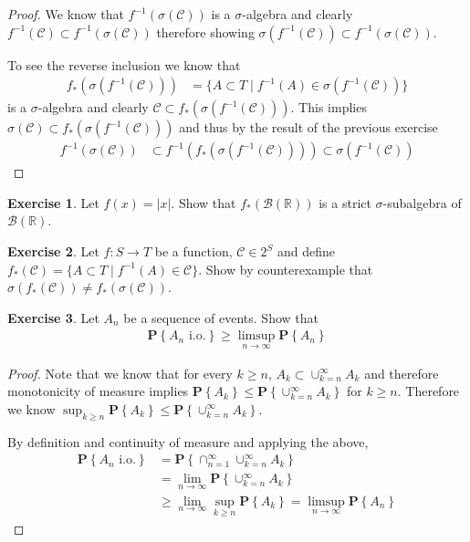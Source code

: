 \documentclass{amsbook}
\theoremstyle{definition}
\newtheorem{xca}{Exercise}
\theoremstyle{remark}
\newcommand{\probability}[1]{\textbf{P}\left \{#1 \right \}}
\newcommand{\reals}{\mathbb{R}}
\newcommand{\abs}[1]{\left \vert #1 \right \vert}
\begin{document}
\begin{proof}
We know that $f^{-1}(\sigma(\mathcal{C}))$ is a $\sigma$-algebra and
clearly $f^{-1}(\mathcal{C}) \subset f^{-1}(\sigma(\mathcal{C}))$
therefore showing $\sigma(f^{-1}(\mathcal{C})) \subset
f^{-1}(\sigma(\mathcal{C}))$.  

To see the reverse inclusion we know that 
\begin{align*}
f_* (\sigma(f^{-1}(\mathcal{C}))) &= \lbrace A \subset T \mid
f^{-1}(A) \in \sigma(f^{-1}(\mathcal{C})) \rbrace
\end{align*}
is a $\sigma$-algebra and clearly $\mathcal{C} \subset f_*
(\sigma(f^{-1}(\mathcal{C})))$.  This implies $\sigma(\mathcal{C}) \subset f_*
(\sigma(f^{-1}(\mathcal{C})))$ and thus by the result of the previous
exercise
\begin{align*}
f^{-1}(\sigma(\mathcal{C})) &\subset 
f^{-1} (f_*(\sigma(f^{-1}(\mathcal{C})))) \subset \sigma(f^{-1}(\mathcal{C}))
\end{align*}
\end{proof}
\begin{xca}Let $f(x) = \abs{x}$.  Show that $f_*(\mathcal{B}(\reals))$
  is a strict $\sigma$-subalgebra of $\mathcal{B}(\reals)$.
\end{xca}
\begin{xca}Let $f : S \to T$ be a function, $\mathcal{C} \in
  2^S$ and define $f_*(\mathcal{C}) =  \{A \subset T \mid
    f^{-1}(A) \in \mathcal{C} \}$.  Show by counterexample that
    $\sigma(f_*(\mathcal{C})) \neq f_*(\sigma(\mathcal{C}))$.
\end{xca}

\begin{xca}Let $A_n$ be a sequence of events. Show that 
\begin{align*}
\probability{A_n \text{ i.o.}} \geq \limsup_{n \to \infty} \probability{A_n}
\end{align*}
\end{xca}
\begin{proof}
Note that we know that for every $k\geq n$, $A_k \subset
\cup_{k=n}^\infty A_k$ and therefore monotonicity of measure implies $\probability{A_k} \leq
\probability{\cup_{k=n}^\infty A_k}$ for $k\geq n$.  Therefore we know
$\sup_{k\geq n} \probability{A_k} \leq
\probability{\cup_{k=n}^\infty A_k}$.

By definition and continuity of measure and applying the above,
\begin{align*}
\probability{A_n \text{ i.o.}} &= \probability{\cap_{n=1}^\infty
  \cup_{k=n}^\infty A_k} \\
&= \lim_{n \to \infty} \probability{\cup_{k=n}^\infty A_k} \\
&\geq \lim_{n \to \infty} \sup_{k \geq n} \probability{ A_k} =
\limsup_{n \to \infty} \probability{ A_n} 
\end{align*}
\end{proof}
\end{document}
